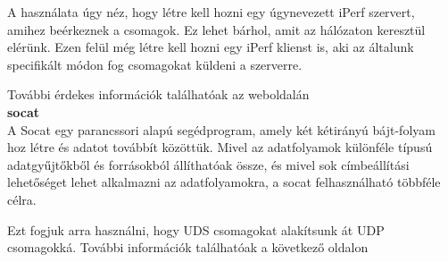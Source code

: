 \documentclass[a4paper,oneside]{article}
\begin{document}
A használata úgy néz, hogy létre kell hozni egy úgynevezett iPerf szervert,
amihez beérkeznek a csomagok. Ez lehet bárhol, amit az hálózaton keresztül elérünk.
Ezen felül még létre kell hozni egy iPerf klienst is, aki az általunk
specifikált módon fog csomagokat küldeni a szerverre.

További érdekes információk találhatóak az weboldalán ~\cite{iperf} \\

\textbf{socat} \\
A Socat egy parancssori alapú segédprogram, amely két kétirányú bájt-folyam
hoz létre és adatot továbbít közöttük. Mivel az adatfolyamok különféle típusú
adatgyűjtőkből és forrásokból állíthatóak össze, és mivel sok címbeállítási
lehetőséget lehet alkalmazni az adatfolyamokra, a socat felhasználható
többféle célra.

Ezt fogjuk arra használni, hogy UDS csomagokat alakítsunk át UDP csomagokká.
További információk találhatóak a következő oldalon ~\cite{socat}


\end{document}
